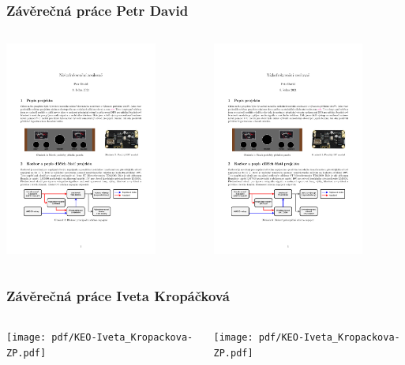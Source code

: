 \documentclass{beamer}
\begin{document}
	\begin{frame}
    \frametitle{Závěrečná práce Petr David}
		
		\begin{columns}
			\begin{column}{0.5\textwidth}
				 \includegraphics[page=3,width=5cm]{pdf/KEO-Petr_David-ZP.pdf}
			\end{column}
			\begin{column}{0.5\textwidth} 
				 \includegraphics[page=4,width=5cm]{pdf/KEO-Petr_David-ZP.pdf}
			\end{column}
		\end{columns}
	
	\end{frame}
	\begin{frame}
    \frametitle{Závěrečná práce Iveta Kropáčková}
		
		\begin{columns}
			\begin{column}{0.5\textwidth}
				 \texttt{[image: pdf/KEO-Iveta\_Kropackova-ZP.pdf]}
			\end{column}
			\begin{column}{0.5\textwidth} 
				 \texttt{[image: pdf/KEO-Iveta\_Kropackova-ZP.pdf]}
			\end{column}
		\end{columns}
	
	\end{frame}
\end{document}
